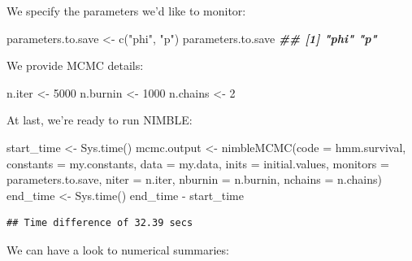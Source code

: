 \documentclass[
  12pt,
]{krantz}
\newenvironment{Shaded}{\begin{snugshade}}{\end{snugshade}}
\newcommand{\AttributeTok}[1]{\textcolor[rgb]{0.77,0.63,0.00}{#1}}
\newcommand{\DecValTok}[1]{\textcolor[rgb]{0.00,0.00,0.81}{#1}}
\newcommand{\DocumentationTok}[1]{\textcolor[rgb]{0.56,0.35,0.01}{\textbf{\textit{#1}}}}
\newcommand{\FunctionTok}[1]{\textcolor[rgb]{0.00,0.00,0.00}{#1}}
\newcommand{\NormalTok}[1]{#1}
\newcommand{\OtherTok}[1]{\textcolor[rgb]{0.56,0.35,0.01}{#1}}
\newcommand{\SpecialCharTok}[1]{\textcolor[rgb]{0.00,0.00,0.00}{#1}}
\newcommand{\StringTok}[1]{\textcolor[rgb]{0.31,0.60,0.02}{#1}}
\begin{document}
We specify the parameters we'd like to monitor:

\begin{Shaded}
\begin{Highlighting}[]
\NormalTok{parameters.to.save }\OtherTok{\textless{}{-}} \FunctionTok{c}\NormalTok{(}\StringTok{"phi"}\NormalTok{, }\StringTok{"p"}\NormalTok{)}
\NormalTok{parameters.to.save}
\DocumentationTok{\#\# [1] "phi" "p"}
\end{Highlighting}
\end{Shaded}

We provide MCMC details:

\begin{Shaded}
\begin{Highlighting}[]
\NormalTok{n.iter }\OtherTok{\textless{}{-}} \DecValTok{5000}
\NormalTok{n.burnin }\OtherTok{\textless{}{-}} \DecValTok{1000}
\NormalTok{n.chains }\OtherTok{\textless{}{-}} \DecValTok{2}
\end{Highlighting}
\end{Shaded}

At last, we're ready to run NIMBLE:

\begin{Shaded}
\begin{Highlighting}[]
\NormalTok{start\_time }\OtherTok{\textless{}{-}} \FunctionTok{Sys.time}\NormalTok{()}
\NormalTok{mcmc.output }\OtherTok{\textless{}{-}} \FunctionTok{nimbleMCMC}\NormalTok{(}\AttributeTok{code =}\NormalTok{ hmm.survival,}
                          \AttributeTok{constants =}\NormalTok{ my.constants,}
                          \AttributeTok{data =}\NormalTok{ my.data,}
                          \AttributeTok{inits =}\NormalTok{ initial.values,}
                          \AttributeTok{monitors =}\NormalTok{ parameters.to.save,}
                          \AttributeTok{niter =}\NormalTok{ n.iter,}
                          \AttributeTok{nburnin =}\NormalTok{ n.burnin,}
                          \AttributeTok{nchains =}\NormalTok{ n.chains)}
\NormalTok{end\_time }\OtherTok{\textless{}{-}} \FunctionTok{Sys.time}\NormalTok{()}
\NormalTok{end\_time }\SpecialCharTok{{-}}\NormalTok{ start\_time}
\end{Highlighting}
\end{Shaded}

\begin{verbatim}
## Time difference of 32.39 secs
\end{verbatim}

We can have a look to numerical summaries:
\end{document}
